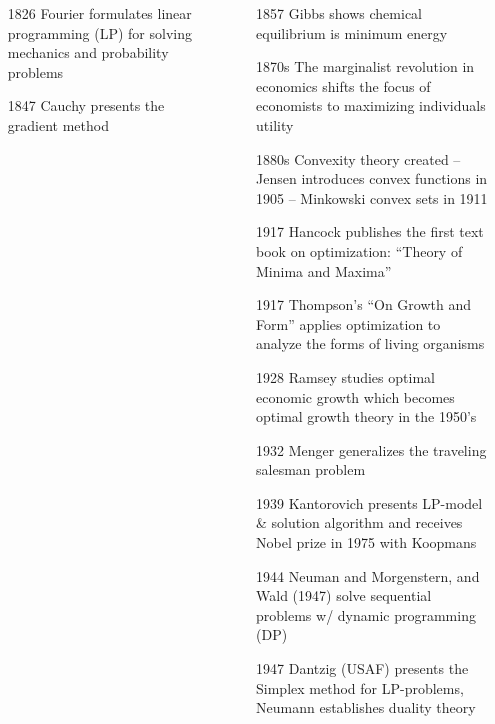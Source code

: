 \documentclass[xcolor={dvipsnames}]{beamer}
\begin{document}
{\begin{columns}
\begin{column}{.5\textwidth}
\begin{itemize}
\item[1826] Fourier formulates linear programming (LP) for solving mechanics and probability problems

\item[1847] Cauchy presents the gradient method

\end{itemize}

\end{column}
\begin{column}{.53\textwidth}

\begin{itemize}
\item[1857] Gibbs shows chemical equilibrium is minimum energy 

\item[1870s] The marginalist revolution in economics shifts the focus of economists to maximizing individuals utility 

\item[1880s] Convexity theory created -- Jensen introduces convex functions in 1905 -- 
 Minkowski convex sets in 1911
 

\item[1917] Hancock publishes the first text book on optimization: ``Theory of Minima and Maxima''

\item [1917]Thompson's ``On Growth and Form'' applies optimization to analyze the forms of living organisms

\item[1928] Ramsey studies optimal economic growth which becomes optimal growth theory in the 1950's

\item[1932] Menger generalizes the traveling salesman problem

\item[1939] Kantorovich presents LP-model \& solution algorithm 
and receives Nobel prize in 1975 with Koopmans 

\item[1944] Neuman and Morgenstern, and Wald (1947) solve 
sequential problems w/ dynamic programming (DP)

\item [1947] Dantzig (USAF) presents the Simplex method for LP-problems, Neumann establishes duality theory


\end{itemize}
\end{column}
\end{columns}}
\end{document}
